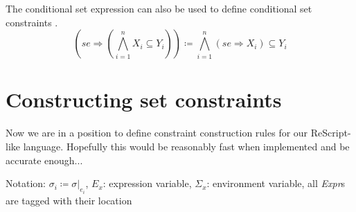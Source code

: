 \documentclass{article}
\newcommand\vbar{|}
\begin{document}
The conditional set expression can also be used to define conditional set constraints \cite{Aik99}.
\[
  \left(se \Rightarrow \left(\bigwedge_{i=1}^{n}{X_{i}\subseteq Y_{i}}\right)\right) \coloneq \bigwedge_{i=1}^{n}{(se \Rightarrow X_{i}) \subseteq Y_{i}}
\]

\section{Constructing set constraints}

Now we are in a position to define constraint construction rules for our ReScript-like language. Hopefully this would be reasonably fast when implemented and be accurate enough...

Notation: $\sigma_{i}\coloneq\sigma\vbar_{e_{i}}$, $E_{x}$: expression variable, $\Sigma_{x}$: environment variable, all \textit{Expr}s are tagged with their location
\end{document}
